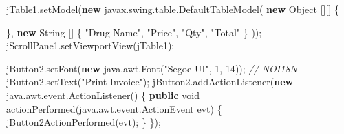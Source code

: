 \documentclass[
  10pt,
]{article}
\newenvironment{Shaded}{}{}
\newcommand{\BuiltInTok}[1]{\textcolor[rgb]{0.00,0.50,0.00}{#1}}
\newcommand{\CommentTok}[1]{\textcolor[rgb]{0.38,0.63,0.69}{\textit{#1}}}
\newcommand{\DataTypeTok}[1]{\textcolor[rgb]{0.56,0.13,0.00}{#1}}
\newcommand{\DecValTok}[1]{\textcolor[rgb]{0.25,0.63,0.44}{#1}}
\newcommand{\FunctionTok}[1]{\textcolor[rgb]{0.02,0.16,0.49}{#1}}
\newcommand{\KeywordTok}[1]{\textcolor[rgb]{0.00,0.44,0.13}{\textbf{#1}}}
\newcommand{\NormalTok}[1]{#1}
\newcommand{\OperatorTok}[1]{\textcolor[rgb]{0.40,0.40,0.40}{#1}}
\newcommand{\StringTok}[1]{\textcolor[rgb]{0.25,0.44,0.63}{#1}}
\begin{document}
\begin{Shaded}
\begin{Highlighting}[numbers=left,,]
\NormalTok{        jTable1}\OperatorTok{.}\FunctionTok{setModel}\OperatorTok{(}\KeywordTok{new}\NormalTok{ javax}\OperatorTok{.}\FunctionTok{swing}\OperatorTok{.}\FunctionTok{table}\OperatorTok{.}\FunctionTok{DefaultTableModel}\OperatorTok{(}
            \KeywordTok{new} \BuiltInTok{Object} \OperatorTok{[][]} \OperatorTok{\{}

            \OperatorTok{\},}
            \KeywordTok{new} \BuiltInTok{String} \OperatorTok{[]} \OperatorTok{\{}
                \StringTok{"Drug Name"}\OperatorTok{,} \StringTok{"Price"}\OperatorTok{,} \StringTok{"Qty"}\OperatorTok{,} \StringTok{"Total"}
            \OperatorTok{\}}
        \OperatorTok{));}
\NormalTok{        jScrollPane1}\OperatorTok{.}\FunctionTok{setViewportView}\OperatorTok{(}\NormalTok{jTable1}\OperatorTok{);}

\NormalTok{        jButton2}\OperatorTok{.}\FunctionTok{setFont}\OperatorTok{(}\KeywordTok{new}\NormalTok{ java}\OperatorTok{.}\FunctionTok{awt}\OperatorTok{.}\FunctionTok{Font}\OperatorTok{(}\StringTok{"Segoe UI"}\OperatorTok{,} \DecValTok{1}\OperatorTok{,} \DecValTok{14}\OperatorTok{));} \CommentTok{// NOI18N}
\NormalTok{        jButton2}\OperatorTok{.}\FunctionTok{setText}\OperatorTok{(}\StringTok{"Print Invoice"}\OperatorTok{);}
\NormalTok{        jButton2}\OperatorTok{.}\FunctionTok{addActionListener}\OperatorTok{(}\KeywordTok{new}\NormalTok{ java}\OperatorTok{.}\FunctionTok{awt}\OperatorTok{.}\FunctionTok{event}\OperatorTok{.}\FunctionTok{ActionListener}\OperatorTok{()} \OperatorTok{\{}
            \KeywordTok{public} \DataTypeTok{void} \FunctionTok{actionPerformed}\OperatorTok{(}\NormalTok{java}\OperatorTok{.}\FunctionTok{awt}\OperatorTok{.}\FunctionTok{event}\OperatorTok{.}\FunctionTok{ActionEvent}\NormalTok{ evt}\OperatorTok{)} \OperatorTok{\{}
                \FunctionTok{jButton2ActionPerformed}\OperatorTok{(}\NormalTok{evt}\OperatorTok{);}
            \OperatorTok{\}}
        \OperatorTok{\});}


\end{Highlighting}
\end{Shaded}
\end{document}
